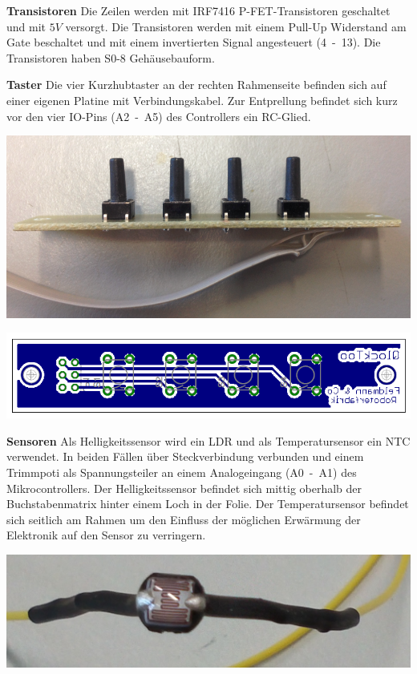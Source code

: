 \begin{multicols}{2}
\textbf{Transistoren} Die Zeilen werden mit IRF7416 P-FET-Transistoren geschaltet und mit $5V$ versorgt. Die Transistoren werden mit einem Pull-Up Widerstand am Gate beschaltet und mit einem invertierten Signal angesteuert (4~-~13). Die Transistoren haben S0-8 Gehäusebauform. 

\textbf{Taster} Die vier Kurzhubtaster an der rechten Rahmenseite befinden sich auf einer eigenen Platine mit Verbindungskabel. Zur Entprellung befindet sich kurz vor den vier IO-Pins (A2~-~A5) des Controllers ein RC-Glied. 

{
\centering 
\includegraphics[width=0.9\columnwidth]{Abbildungen/Konstruktion/Taster02} 

}

{
\centering 
\includegraphics[width=0.8\columnwidth]{Abbildungen/Elektronik/Taster01} 

}

\textbf{Sensoren} Als Helligkeitssensor wird ein LDR und als Temperatursensor ein NTC verwendet. In beiden Fällen über Steckverbindung verbunden und einem Trimmpoti als Spannungsteiler an einem Analogeingang (A0~-~A1) des Mikrocontrollers. Der Helligkeitssensor befindet sich mittig oberhalb der Buchstabenmatrix hinter einem Loch in der Folie. Der Temperatursensor befindet sich seitlich am Rahmen um den Einfluss der möglichen Erwärmung der Elektronik auf den Sensor zu verringern. \newline

{
\centering 
\includegraphics[width=0.9\columnwidth]{Abbildungen/Elektronik/LDR} 

}
\end{multicols}
